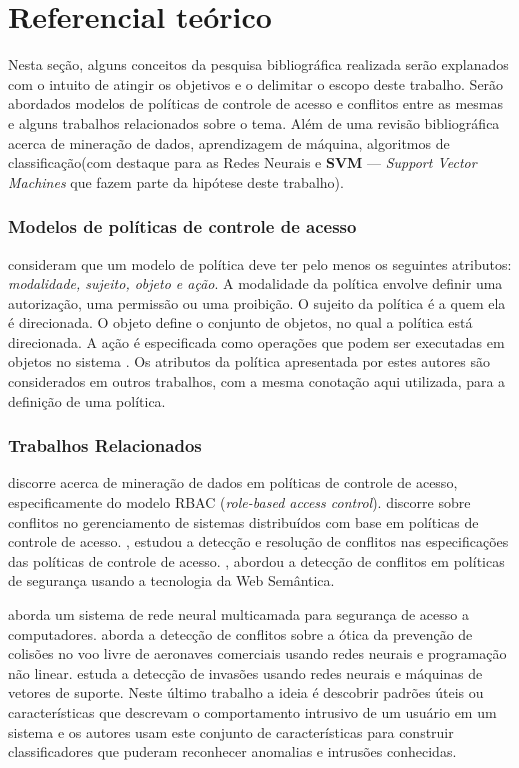 \chapter{Referencial teórico}\label{referencial_teorico}
Nesta seção, alguns conceitos da pesquisa bibliográfica realizada serão explanados com o intuito de atingir os objetivos e o delimitar o escopo deste trabalho. Serão abordados modelos de políticas de controle de acesso e conflitos entre as mesmas e alguns trabalhos relacionados sobre o tema. Além de uma revisão bibliográfica acerca de mineração de dados, aprendizagem de máquina, algoritmos de classificação(com destaque para as Redes Neurais e \textbf{SVM} --- \textit{Support Vector Machines} que fazem parte da hipótese deste trabalho).
\subsection{Modelos de políticas de controle de acesso}\label{modelo_politicas}
\cite{moffett_policy_1994} consideram que um modelo de política deve ter pelo menos os seguintes atributos: \textit{modalidade, sujeito, objeto e ação}. A modalidade da política envolve definir uma autorização, uma permissão ou uma proibição. O sujeito da política é a quem ela é direcionada. O objeto define o conjunto de objetos, no qual a política está direcionada. A ação é especificada como operações que podem ser executadas em objetos no sistema \cite{moffett_policy_1994}. Os atributos da política apresentada por estes autores são considerados em outros trabalhos, com a mesma conotação aqui utilizada, para a definição de uma política.\cite{sarkis2017}

\subsection{Trabalhos Relacionados}\label{trabalhos_relacionados}
\cite{bui_efficient_2019} discorre acerca de mineração de dados em políticas de controle de acesso, especificamente do modelo RBAC (\textit{role-based access control}). \cite{lupu_conflicts_1999} discorre sobre conflitos no gerenciamento de sistemas distribuídos com base em políticas de controle de acesso. \cite{koch_conflict_2002}, estudou a detecção e resolução de conflitos nas especificações das políticas de controle de acesso. \cite{neri_conflict_2012}, abordou a detecção de conflitos em políticas de segurança usando a tecnologia da Web Semântica.

\cite{obaidat_multilayer_1994} aborda um sistema de rede neural multicamada para segurança de acesso a computadores. \cite{christodoulou_collision_2008} aborda a detecção de conflitos sobre a ótica da prevenção de colisões no voo livre de aeronaves comerciais usando redes neurais e programação não linear. \cite{mukkamala_intrusion_2002} estuda a detecção de invasões usando redes neurais e máquinas de vetores de suporte. Neste último trabalho a ideia é descobrir padrões úteis ou características que descrevam o comportamento intrusivo de um usuário em um sistema e os autores usam este conjunto de características para construir classificadores que puderam reconhecer anomalias e intrusões conhecidas. 

